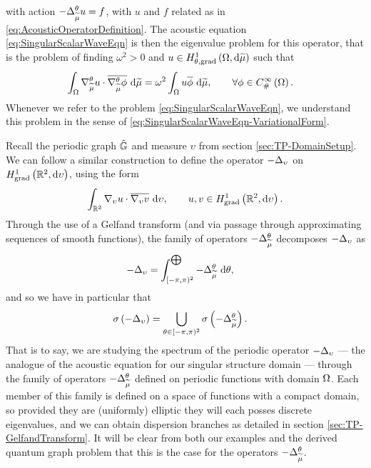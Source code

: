 with action $-\Delta_{\widetilde{\mu}}^{\theta} u = f$, with $u$ and $f$ related as in \eqref{eq:AcousticOperatorDefinition}.
The acoustic equation \eqref{eq:SingularScalarWaveEqn} is then the eigenvalue problem for this operator, that is the problem of finding $\omega^2>0$ and $u\in H^1_{\theta, \mathrm{grad}}\left( \Omega, \mathrm{d}\widetilde{\mu} \right)$ such that
\begin{align} \label{eq:SingularScalarWaveEqn-VariationalForm}
	\int_{\Omega} \nabla^{\theta}_{\widetilde{\mu}}u\cdot\overline{\nabla^{\theta}_{\widetilde{\mu}}\phi}  \ \mathrm{d}\widetilde{\mu}
	&= \omega^2 \int_{\Omega} u\overline{\phi}  \ \mathrm{d}\widetilde{\mu},
	\qquad\forall\phi\in C^{\infty}_{\#}\left( \Omega \right).
\end{align}
Whenever we refer to the problem \eqref{eq:SingularScalarWaveEqn}, we understand this problem in the sense of \eqref{eq:SingularScalarWaveEqn-VariationalForm}.

Recall the periodic graph $\hat{\mathbb{G}}$ and measure $\upsilon$ from section \ref{sec:TP-DomainSetup}.
We can follow a similar construction to define the operator $-\Delta_{\upsilon}$ on $H^1_\mathrm{grad}\left( \mathbb{R}^2, \mathrm{d}\upsilon \right)$, using the form
\begin{align*}
	\int_{\mathbb{R}^2} \nabla_{\upsilon}u\cdot\overline{\nabla_{\upsilon}v}  \ \mathrm{d}\upsilon,
	\qquad u,v\in H^1_\mathrm{grad}\left( \mathbb{R}^2, \mathrm{d}\upsilon \right).
\end{align*}
Through the use of a Gelfand transform (and via passage through approximating sequences of smooth functions), the family of operators $-\Delta_{\widetilde{\mu}}^{\theta}$ decomposes $-\Delta_{\upsilon}$ as
\begin{align*}
	-\Delta_{\upsilon} &= \int_{[-\pi,\pi)^2}^{\bigoplus} -\Delta_{\widetilde{\mu}}^{\theta} \ \mathrm{d}\theta,
\end{align*}
and so we have in particular that
\begin{align*}
	\sigma\left(  -\Delta_{\upsilon}  \right) &= \bigcup_{\theta\in[-\pi,\pi)^2} \sigma\left(  -\Delta_{\widetilde{\mu}}^{\theta}  \right).
\end{align*}
That is to say, we are studying the spectrum of the periodic operator $-\Delta_{\upsilon}$ --- the analogue of the acoustic equation for our singular structure domain --- through the family of operators $-\Delta_{\widetilde{\mu}}^{\theta}$ defined on periodic functions with domain $\Omega$.
Each member of this family is defined on a space of functions with a compact domain, so provided they are (uniformly) elliptic they will each posses discrete eigenvalues, and we can obtain dispersion branches as detailed in section \ref{sec:TP-GelfandTransform}.
It will be clear from both our examples and the derived quantum graph problem that this is the case for the operators $-\Delta_{\widetilde{\mu}}^{\theta}$.

